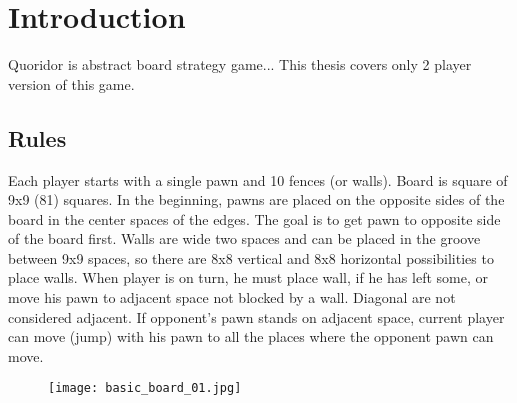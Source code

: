 \documentclass[12pt, oneside]{book}
\author{\mfauthor}
\title{\thesisname}
\date{\mfyear}
\begin{document}
  
  \newpage

  
  \newpage




  \section{Introduction}
    Quoridor is abstract board strategy game...
    This thesis covers only 2 player version of this game.
    \subsection{Rules}
    Each player starts with a single pawn and 10 fences (or walls). Board is
    square of 9x9 (81) squares. In the beginning, pawns are placed on the
    opposite sides of the board in the center spaces of the edges. The goal is
    to get pawn to opposite side of the board first. Walls are wide two spaces
    and can be placed in the groove between 9x9 spaces, so there are 8x8
    vertical and 8x8 horizontal possibilities to place walls. When player is
    on turn, he must place wall, if he has left some, or move his pawn
    to adjacent space not blocked by a wall. Diagonal are not considered
    adjacent. If opponent's pawn stands on adjacent space, current player can
    move (jump) with his pawn to all the places where the opponent pawn can
    move.
    \begin{figure}
      \texttt{[image: basic\_board\_01.jpg]}
    \end{figure}
\end{document}

